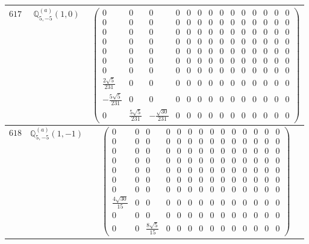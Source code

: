 \documentclass[fleqn,8pt,landscape]{jsarticle}
\begin{document}
\begin{center}
\begin{longtable}{ccc}
$ 617 $ & $ \mathbb{Q}_{5,-5}^{(a)}(1,0) $ & $ \begin{pmatrix} 0 & 0 & 0 & 0 & 0 & 0 & 0 & 0 & 0 & 0 & 0 & 0 & 0 & 0 \\ 0 & 0 & 0 & 0 & 0 & 0 & 0 & 0 & 0 & 0 & 0 & 0 & 0 & 0 \\ 0 & 0 & 0 & 0 & 0 & 0 & 0 & 0 & 0 & 0 & 0 & 0 & 0 & 0 \\ 0 & 0 & 0 & 0 & 0 & 0 & 0 & 0 & 0 & 0 & 0 & 0 & 0 & 0 \\ 0 & 0 & 0 & 0 & 0 & 0 & 0 & 0 & 0 & 0 & 0 & 0 & 0 & 0 \\ 0 & 0 & 0 & 0 & 0 & 0 & 0 & 0 & 0 & 0 & 0 & 0 & 0 & 0 \\ 0 & 0 & 0 & 0 & 0 & 0 & 0 & 0 & 0 & 0 & 0 & 0 & 0 & 0 \\ \frac{2 \sqrt{5}}{231} & 0 & 0 & 0 & 0 & 0 & 0 & 0 & 0 & 0 & 0 & 0 & 0 & 0 \\ - \frac{5 \sqrt{5}}{231} & 0 & 0 & 0 & 0 & 0 & 0 & 0 & 0 & 0 & 0 & 0 & 0 & 0 \\ 0 & \frac{5 \sqrt{5}}{231} & - \frac{\sqrt{30}}{231} & 0 & 0 & 0 & 0 & 0 & 0 & 0 & 0 & 0 & 0 & 0 \end{pmatrix} $ \\ \hline
$ 618 $ & $ \mathbb{Q}_{5,-5}^{(a)}(1,-1) $ & $ \begin{pmatrix} 0 & 0 & 0 & 0 & 0 & 0 & 0 & 0 & 0 & 0 & 0 & 0 & 0 & 0 \\ 0 & 0 & 0 & 0 & 0 & 0 & 0 & 0 & 0 & 0 & 0 & 0 & 0 & 0 \\ 0 & 0 & 0 & 0 & 0 & 0 & 0 & 0 & 0 & 0 & 0 & 0 & 0 & 0 \\ 0 & 0 & 0 & 0 & 0 & 0 & 0 & 0 & 0 & 0 & 0 & 0 & 0 & 0 \\ 0 & 0 & 0 & 0 & 0 & 0 & 0 & 0 & 0 & 0 & 0 & 0 & 0 & 0 \\ 0 & 0 & 0 & 0 & 0 & 0 & 0 & 0 & 0 & 0 & 0 & 0 & 0 & 0 \\ 0 & 0 & 0 & 0 & 0 & 0 & 0 & 0 & 0 & 0 & 0 & 0 & 0 & 0 \\ \frac{4 \sqrt{30}}{15} & 0 & 0 & 0 & 0 & 0 & 0 & 0 & 0 & 0 & 0 & 0 & 0 & 0 \\ 0 & 0 & 0 & 0 & 0 & 0 & 0 & 0 & 0 & 0 & 0 & 0 & 0 & 0 \\ 0 & 0 & \frac{8 \sqrt{5}}{15} & 0 & 0 & 0 & 0 & 0 & 0 & 0 & 0 & 0 & 0 & 0 \end{pmatrix} $ \\ \hline

\end{longtable}
\end{center}
\end{document}
